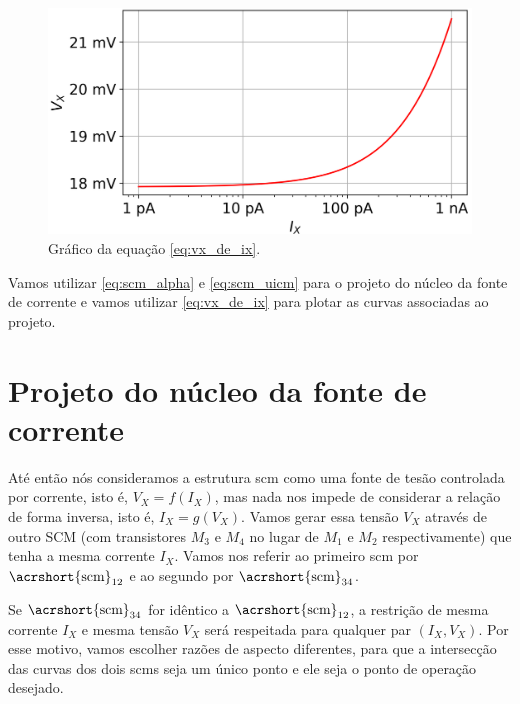 \documentclass[10pt,a4paper]{extreport}
\newcommand{\?}{\stackrel{?}{=}}
\newcommand{\mysize}{0.69}
\begin{document}
\begin{figure}[htp!]
    \includegraphics[width=\mysize\linewidth]{Imagens/scm_single_plot.png}
    \centering
    \caption{Gráfico da equação \eqref{eq:vx_de_ix}.}
    \label{fig:scm_single_plot}
\end{figure}

Vamos utilizar \eqref{eq:scm_alpha} e \eqref{eq:scm_uicm} para o projeto do núcleo da fonte de corrente e vamos utilizar \eqref{eq:vx_de_ix} para plotar as curvas associadas ao projeto.

\section{Projeto do núcleo da fonte de corrente}

Até então nós consideramos a estrutura \acrshort{scm} como uma fonte de tesão controlada por corrente, isto é, $V_X=f(I_X)$, mas nada nos impede de considerar a relação de forma inversa, isto é, $I_X=g(V_X)$. Vamos gerar essa tensão $V_X$ através de outro SCM (com transistores $M_3$ e $M_4$ no lugar de $M_1$ e $M_2$ respectivamente) que tenha a mesma corrente $I_X$. Vamos nos referir ao primeiro \acrshort{scm} por $\text{\acrshort{scm}}_{12}$ e ao segundo por $\text{\acrshort{scm}}_{34}$.

Se $\text{\acrshort{scm}}_{34}$ for idêntico a $\text{\acrshort{scm}}_{12}$, a restrição de mesma corrente $I_X$ e mesma tensão $V_X$ será respeitada para qualquer par $(I_X,V_X)$. Por esse motivo, vamos escolher razões de aspecto diferentes, para que a intersecção das curvas dos dois \acrshort{scm}s seja um único ponto e ele seja o ponto de operação desejado.
\end{document}
